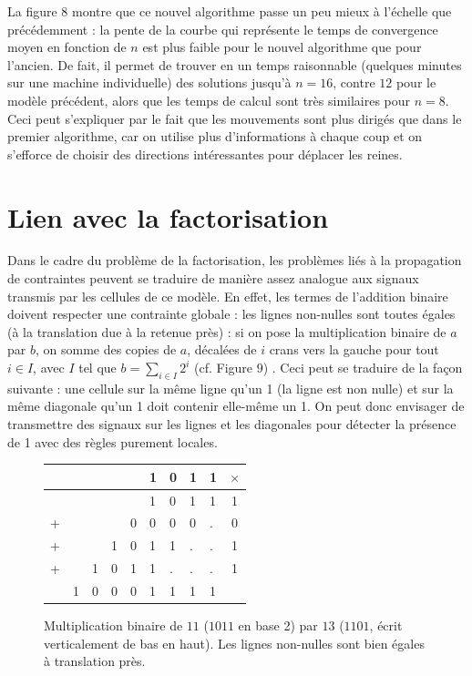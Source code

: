 \documentclass[11pt, openany]{article}
\begin{document}
La figure $8$ montre que ce nouvel algorithme passe un peu mieux à l'échelle que précédemment : la pente de la courbe qui représente le temps de convergence moyen en fonction de $n$ est plus faible pour le nouvel algorithme que pour l'ancien. De fait, il permet de trouver en un temps raisonnable (quelques minutes sur une machine individuelle) des solutions jusqu'à $n=16$, contre $12$ pour le modèle précédent, alors que les temps de calcul sont très similaires pour $n=8$. Ceci peut s'expliquer par le fait que les mouvements sont plus dirigés que dans le premier algorithme, car on utilise plus d'informations à chaque coup et on s'efforce de choisir des directions intéressantes pour déplacer les reines.


\clearpage

\section*{Lien avec la factorisation}

Dans le cadre du problème de la factorisation, les problèmes liés à la propagation de contraintes peuvent se traduire de manière assez analogue aux signaux transmis par les cellules de ce modèle. En effet, les termes de l'addition binaire doivent respecter une contrainte globale : les lignes non-nulles sont toutes égales (à la translation due à la retenue près) : si on pose la multiplication binaire de $a$ par $b$, on somme des copies de $a$, décalées de $i$ crans vers la gauche pour tout $i\in I$, avec $I$ tel que $b = \sum_{i\in I}2^i$ (cf. Figure $9$) . Ceci peut se traduire de la façon suivante : une cellule sur la même ligne qu'un 1 (la ligne est non nulle) et sur la même diagonale qu'un 1 doit contenir elle-même un 1. On peut donc envisager de transmettre des signaux sur les lignes et les diagonales pour détecter la présence de 1 avec des règles purement locales. 

\begin{figure}
\centering
\begin{tabular}{lllllllll|c}
&&&&&1&0&1&1&$\times$\\
\hline
&&&&&1&0&1&1&1\\
+&&&&0&0&0&0&.&0 \\
+&&&1&0&1&1&.&.&1\\
+&&1&0&1&1&.&.&.&1\\
\hline
&1&0&0&0&1&1&1&1&\\
\end{tabular}
\caption{Multiplication binaire de $11$ ($1011$ en base 2) par $13$ ($1101$, écrit verticalement de bas en haut). Les lignes non-nulles sont bien égales à translation près.}
\end{figure}


\nocite{BahiC06}
\nocite{ChevFat08}
\nocite{Fat13}


\end{document}
